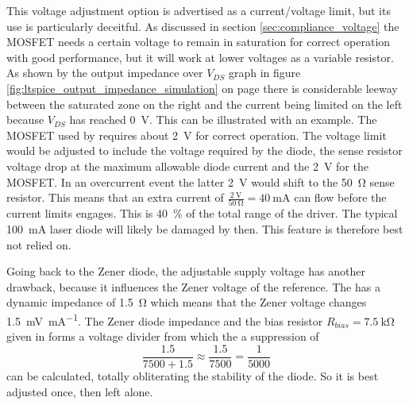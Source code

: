 This voltage adjustment option is advertised as a current/voltage limit, but its use is particularly deceitful. As discussed in section \ref{sec:compliance_voltage} the MOSFET needs a certain voltage to remain in saturation for correct operation with good performance, but it will work at lower voltages as a variable resistor. As shown by the output impedance over $V_{DS}$ graph in figure \ref{fig:ltspice_output_impedance_simulation} on page \pageref{fig:ltspice_output_impedance_simulation} there is considerable leeway between the saturated zone on the right and the current being limited on the left because $V_{DS}$ has reached \qty{0}{\V}. This can be illustrated with an example. The  MOSFET \cite{datasheet_VP0106} used by \citeauthor{libbrecht_hall} \cite{libbrecht_hall} requires about \qty{2}{\V} for correct operation. The voltage limit would be adjusted to include the voltage required by the diode, the sense resistor voltage drop at the maximum allowable diode current and the \qty{2}{\V} for the MOSFET. In an overcurrent event the latter \qty{2}{\V} would shift to the \qty{50}{\ohm} sense resistor. This means that an extra current of $\frac{\qty{2}{\V}}{\qty{50}{\ohm}} = \qty{40}{\mA}$ can flow before the current limits engages. This is \qty{40}{\percent} of the total range of the driver. The typical \qty{100}{\mA} laser diode will likely be damaged by then. This feature is therefore best not relied on.

Going back to the Zener diode, the adjustable supply voltage has another drawback, because it influences the Zener voltage of the reference. The  has a dynamic impedance of \qty{1.5}{\ohm} \cite{datasheet_LM399} which means that the Zener voltage changes \qty{1.5}{\mV \per \mA}. The Zener diode impedance and the bias resistor $R_{bias} = \qty{7.5}{\kilo\ohm}$ given in \cite{libbrecht_hall} forms a voltage divider from which the a suppression of
\begin{equation*}
\frac{1.5}{7500 + 1.5} \approx \frac{1.5}{7500} = \frac{1}{5000}
\end{equation*}
can be calculated, totally obliterating the stability of the diode. So it is best adjusted once, then left alone.

